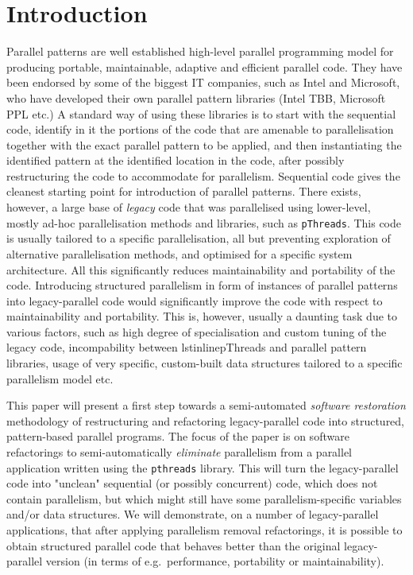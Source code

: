 \documentclass{llncs}
\begin{document}
\section{Introduction}
Parallel patterns are well established high-level parallel programming model for producing portable, maintainable, adaptive and efficient parallel code. They have been endorsed by some of the biggest IT companies, such as Intel and Microsoft, who have developed their own parallel pattern libraries (Intel TBB, Microsoft PPL etc.) A standard way of using these libraries is to start with the sequential code, identify in it the portions of the code that are amenable to parallelisation together with the exact parallel pattern to be applied, and then instantiating the identified pattern at the identified location in the code, after possibly restructuring the code to accommodate for parallelism. Sequential code gives the cleanest starting point for introduction of parallel patterns. There exists, however, a large base of \emph{legacy} code that was parallelised using lower-level, mostly ad-hoc parallelisation methods and libraries, such as \lstinline{pThreads}. This code is usually tailored to a specific parallelisation, all but preventing exploration of alternative parallelisation methods, and optimised for a specific system architecture. All this significantly reduces maintainability and portability of the code. %
Introducing structured parallelism in form of instances of parallel patterns into legacy-parallel code would significantly improve the code with respect to maintainability and portability. This is, however, usually a daunting task due to various factors, such as high degree of specialisation and custom tuning of the legacy code, incompability between lstinline{pThreads} and parallel pattern libraries, usage of very specific, custom-built data structures tailored to a specific parallelism model etc.
  
This paper will present a first step towards a semi-automated \emph{software restoration} methodology of restructuring and refactoring legacy-parallel code into structured, pattern-based parallel programs. The focus of the paper is on software refactorings to semi-automatically \emph{eliminate} parallelism from a parallel application written using the \lstinline{pthreads} library. This will turn the legacy-parallel code into "unclean" sequential (or possibly concurrent) code, which does not contain parallelism, but which might still have some parallelism-specific variables and/or data structures. We will demonstrate, on a number of legacy-parallel applications, that after applying parallelism removal refactorings, it is possible to obtain structured parallel code that behaves better than the original legacy-parallel version (in terms of e.g.~performance, portability or maintainability).
\end{document}
